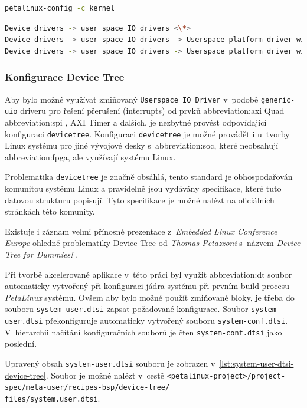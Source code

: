 \documentclass[a4paper, twoside, 11pt]{article}
\newcommand{\fbar}{\FloatBarrier}
\begin{document}
\begin{lstlisting}[language={sh}, caption={PetaLinux příkaz pro konfiguraci jádra systému.}, label= {lst:petalinux-config-c-kernel}, morekeywords={petalinux-build, petalinux-package, petalinux-config}]
petalinux-config -c kernel\end{lstlisting}

\begin{lstlisting}[language={sh}, caption={PetaLinux konfigurace pro User Space IO Driver.}, label= {lst:petalinux-config-c-kernel-userspace-io-driver}]
Device drivers -> user space IO drivers <\*>
Device drivers -> user space IO drivers -> Userspace platform driver with generic irq and dynamic memory <*>
Device drivers -> user space IO drivers -> Userspace platform driver with generic IRQ handling <*>\end{lstlisting}

		\fbar
		\subsubsection{Konfigurace Device Tree}\label{subsubsec:konfigurace-device-tree}
		Aby bylo možné využívat zmiňovaný \texttt{Userspace IO Driver} v~podobě \texttt{generic-uio} driveru pro řešení přerušení (interrupts) od prvků \gls{abbreviation:axi} Quad \gls{abbreviation:spi} \cite{axi-quad-spi-ip-product-guide}, AXI Timer \cite{axi-timer-v-2-0-ip-product-guide} a dalších, je nezbytné provést odpovídající konfiguraci \texttt{devicetree}. Konfiguraci \texttt{devicetree} je možné provádět i u~tvorby Linux systému pro jiné vývojové desky s~\gls{abbreviation:soc}, které neobsahují \gls{abbreviation:fpga}, ale využívají systému Linux.\par
		Problematika \texttt{devicetree} je značně obsáhlá, tento standard je obhospodařován komunitou systému Linux a pravidelně jsou vydávány specifikace, které tuto datovou strukturu popisují. Tyto specifikace je možné nalézt na oficiálních stránkách této komunity. \cite{devicetree-org-specification}\par
		Existuje i záznam velmi přínosné prezentace z~\textit{Embedded Linux Conference Europe} ohledně problematiky Device Tree od \textit{Thomas Petazzoni} s~názvem \textit{Device Tree for Dummies!} \cite{youtube-devicetree-for-dummies}.\par
		Při tvorbě akcelerované aplikace v~této práci byl využit \gls{abbreviation:dt} soubor automaticky vytvořený při konfiguraci jádra systému při prvním build procesu \textit{PetaLinux} systému. Ovšem aby bylo možné použít zmiňované bloky, je třeba do souboru \texttt{system-user.dtsi} zapsat požadované konfigurace. Soubor \texttt{system-user.dtsi} překonfiguruje automaticky vytvořený souboru \texttt{system-conf.dtsi}. V~hierarchii načítání konfiguračních souborů je čten \texttt{system-conf.dtsi} jako poslední.\par
		Upravený obsah \texttt{system-user.dtsi} souboru je zobrazen v~\ref{lst:system-user-dtsi-device-tree}. Soubor je možné nalézt v~cestě \texttt{<petalinux-project>/project-spec/meta-user/recipes-bsp/device-tree/\\files/system.user.dtsi}.\par
\end{document}
